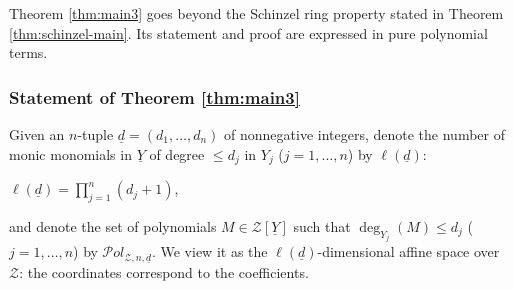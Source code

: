 \documentclass[11pt,a4paper,reqno]{amsart}
\theoremstyle{definition}
\begin{document}
 Theorem \ref{thm:main3} goes beyond the Schinzel ring property stated in Theorem \ref{thm:schinzel-main}. Its statement and proof are expressed in pure polynomial terms. 

 
\subsubsection{Statement of Theorem \ref{thm:main3}}
Given an $n$-tuple $\underline d=(d_1,\ldots,d_n)$ of nonnegative integers, denote the number of monic monomials in $\underline Y$ of degree $\leq d_j$ in $Y_j$ ($j=1,\ldots,n$) by $\ell(\underline d)$:
\vskip 1mm

\centerline{$\ell(\underline d) = \prod_{j=1}^n (d_j+1)$,}
\vskip 1mm

\noindent
and denote the set of polynomials $M \in {\mathcal Z}[\underline Y]$ such that $\deg_{Y_j}(M) \leq d_j$ 
($j= 1,\ldots,n$) by ${\mathcal P}ol_{{\mathcal Z},n,\underline{d}}$. We view it as the $\ell(\underline d)$-dimensional affine space over ${\mathcal Z}$: the coordinates correspond to the coefficients.
\end{document}
